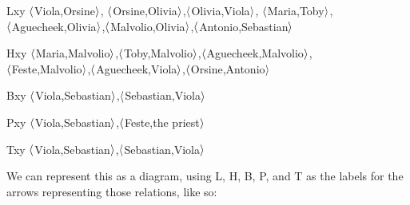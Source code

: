 \begin{ekey}
\item[Lxy] $\langle$Viola,Orsine$\rangle$, $\langle$Orsine,Olivia$\rangle$,$\langle$Olivia,Viola$\rangle$, $\langle$Maria,Toby$\rangle$,\\$\langle$Aguecheek,Olivia$\rangle$,$\langle$Malvolio,Olivia$\rangle$,$\langle$Antonio,Sebastian$\rangle$

\item[Hxy] $\langle$Maria,Malvolio$\rangle$,$\langle$Toby,Malvolio$\rangle$,$\langle$Aguecheek,Malvolio$\rangle$,\\$\langle$Feste,Malvolio$\rangle$,$\langle$Aguecheek,Viola$\rangle$,$\langle$Orsine,Antonio$\rangle$

\item[Bxy] $\langle$Viola,Sebastian$\rangle$,$\langle$Sebastian,Viola$\rangle$
\item[Pxy] $\langle$Viola,Sebastian$\rangle$,$\langle$Feste,the priest$\rangle$
\item[Txy] $\langle$Viola,Sebastian$\rangle$,$\langle$Sebastian,Viola$\rangle$
\end{ekey}

We can represent this as a diagram, using L, H, B, P, and T as the labels for the arrows representing those relations, like so:

